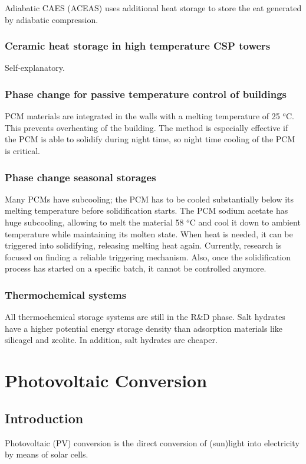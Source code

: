 \documentclass[a4paper,10pt]{article}
\begin{document}
Adiabatic CAES (ACEAS) uses additional heat storage to store the eat generated by adiabatic compression.

\subsubsection{Ceramic heat storage in high temperature CSP towers}
Self-explanatory.

\subsubsection{Phase change for passive temperature control of buildings}
PCM materials are integrated in the walls with a melting temperature of 25 $^o$C. This prevents overheating of the building. The method is especially effective if the PCM is able to solidify during night time, so night time cooling of the PCM is critical.

\subsubsection{Phase change seasonal storages}
Many PCMs have subcooling; the PCM has to be cooled substantially below its melting temperature before solidification starts. The PCM sodium acetate has huge subcooling, allowing to melt the material 58 $^o$C and cool it down to ambient temperature while maintaining its molten state. When heat is needed, it can be triggered into solidifying, releasing melting heat again. Currently, research is focused on finding a reliable triggering mechanism. Also, once the solidification process has started on a specific batch, it cannot be controlled anymore.

\subsubsection{Thermochemical systems}
All thermochemical storage systems are still in the R\&D phase. Salt hydrates have a higher potential energy storage density than adsorption materials like silicagel and zeolite. In addition, salt hydrates are cheaper.


\section{Photovoltaic Conversion}
\subsection{Introduction}
Photovoltaic (PV) conversion is the direct conversion of (sun)light into electricity by means of solar cells.
\end{document}
